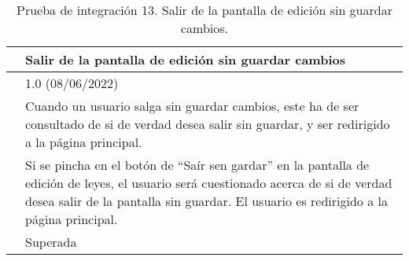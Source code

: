 \begin{table}[H]
\begin{center}
\begin{tabular}{|p{3cm}|p{10cm}|} \hline
\centering {\bf PI-13} & Salir de la pantalla de edición sin guardar cambios  \\ \hline\hline
\centering {\bf Versión} & 1.0 (08/06/2022) \\ \hline
\centering {\bf Descripción} & Cuando un usuario salga sin guardar cambios, este ha de ser consultado de si de verdad desea salir sin guardar, y ser redirigido a la página principal. \\ \hline
\centering {\bf Criterio de aceptación} & Si se pincha en el botón de ``Saír sen gardar'' en la pantalla de edición de leyes, el usuario será cuestionado acerca de si de verdad desea salir de la pantalla sin guardar. El usuario es redirigido a la página principal. \\ \hline
\centering {\bf Estado} & Superada \\ \hline
\end{tabular}
\caption{Prueba de integración 13. Salir de la pantalla de edición sin guardar cambios.}
\label{enlacePI13}
\end{center}
\end{table}
